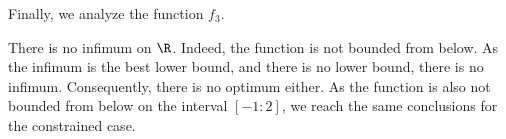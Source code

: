 Finally, we analyze the function $f_3$.


\begin{center}
\end{center}

There is no infimum on $\R$. Indeed, the function is not bounded from
below. As the infimum is the best lower bound, and there is no lower
bound, there is no infimum. Consequently, there is no optimum
either. As the function is also not bounded from below on the interval
$[-1:2]$, we reach the same conclusions for the constrained case. 

